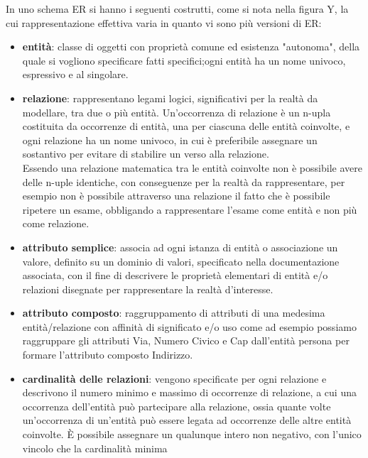 \documentclass[a4paper,12pt, oneside]{book}
\begin{document}
In uno schema ER si hanno i seguenti costrutti, come si nota nella figura Y,
la cui rappresentazione effettiva varia in quanto vi sono più versioni di ER:
\begin{itemize}
        \item \textbf{entità}: classe di oggetti con proprietà comune ed esistenza "autonoma", della quale si vogliono specificare 
              fatti specifici;ogni entità ha un nome univoco, espressivo e al singolare.
      \item \textbf{relazione}: rappresentano legami logici, significativi per la realtà da modellare, tra due o più entità.\newline
            Un'occorrenza di relazione è un n-upla costituita da occorrenze di entità, una per ciascuna delle entità coinvolte,
          e ogni relazione ha un nome univoco, in cui è preferibile assegnare un sostantivo per evitare di stabilire un verso alla relazione.\\
          Essendo una relazione matematica tra le entità coinvolte non è possibile avere delle n-uple identiche, con conseguenze
          per la realtà da rappresentare, per esempio non è possibile attraverso una relazione il fatto che è possibile 
          ripetere un esame, obbligando a rappresentare l'esame come entità e non più come relazione.
  \item \textbf{attributo semplice}: associa ad ogni istanza di entità o associazione un valore, definito su un dominio di valori,
          specificato nella documentazione associata, con il fine di descrivere le proprietà elementari 
          di entità e/o relazioni disegnate per rappresentare la realtà d'interesse.\newline
  \item \textbf{attributo composto}: raggruppamento di attributi di una medesima entità/relazione con affinità di significato e/o uso
          come ad esempio possiamo raggruppare gli attributi Via, Numero Civico e Cap dall'entità persona per formare 
          l'attributo composto Indirizzo.
  \item \textbf{cardinalità delle relazioni}: vengono specificate per ogni relazione e descrivono il numero minimo e massimo di occorrenze
            di relazione, a cui una occorrenza dell'entità può partecipare alla relazione, ossia quante volte un'occorrenza 
            di un'entità può essere legata ad occorrenze delle altre entità coinvolte.\newline
          È possibile assegnare un qualunque intero non negativo, con l'unico vincolo che la cardinalità minima 

\end{itemize}
\end{document}
